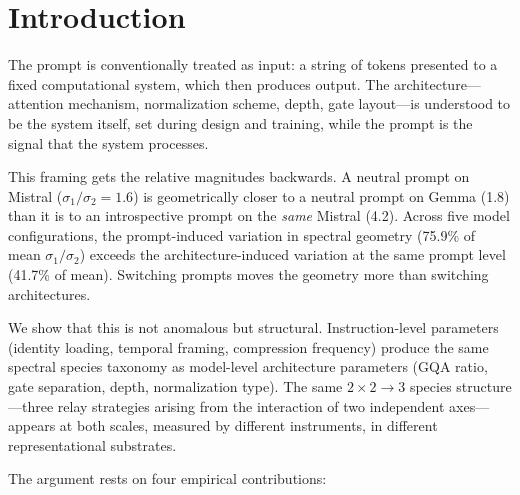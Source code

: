 \documentclass[12pt]{article}
\begin{document}
\section{Introduction}

The prompt is conventionally treated as input: a string of tokens presented to a fixed computational system, which then produces output. The architecture---attention mechanism, normalization scheme, depth, gate layout---is understood to be the system itself, set during design and training, while the prompt is the signal that the system processes.

This framing gets the relative magnitudes backwards. A neutral prompt on Mistral ($\sigma_1/\sigma_2 = 1.6$) is geometrically closer to a neutral prompt on Gemma (1.8) than it is to an introspective prompt on the \emph{same} Mistral (4.2). Across five model configurations, the prompt-induced variation in spectral geometry (75.9\% of mean $\sigma_1/\sigma_2$) exceeds the architecture-induced variation at the same prompt level (41.7\% of mean). Switching prompts moves the geometry more than switching architectures.

We show that this is not anomalous but structural. Instruction-level parameters (identity loading, temporal framing, compression frequency) produce the same spectral species taxonomy as model-level architecture parameters (GQA ratio, gate separation, depth, normalization type). The same $2 \times 2 \to 3$ species structure---three relay strategies arising from the interaction of two independent axes---appears at both scales, measured by different instruments, in different representational substrates.

The argument rests on four empirical contributions:
\end{document}
